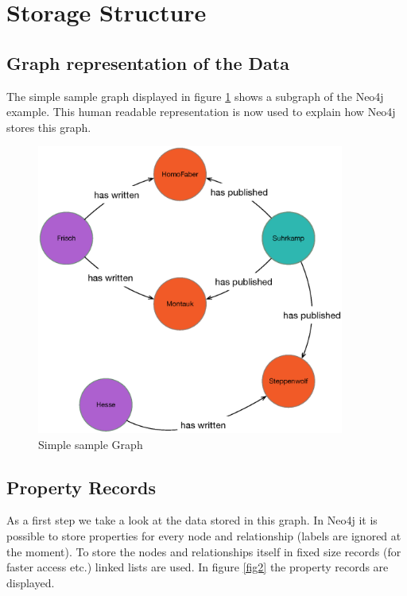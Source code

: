 
\section{Storage Structure}

\subsection{Graph representation of the Data}
The simple sample graph displayed in figure \ref{fig1} shows a subgraph of the Neo4j example.
This human readable representation is now used to explain how Neo4j stores this graph. \nocite{storage1} \nocite{storage2}

\begin{figure}
	\centering
 	 	\includegraphics[width=0.9\textwidth]{images/theGraph.eps}
	\caption{Simple sample Graph}
	\label{fig1}
\end{figure}

\subsection{Property Records}
As a first step we take a look at the data stored in this graph. In Neo4j it is possible to store properties for every node and relationship (labels are ignored at the moment). To store the nodes and relationships itself in fixed size records (for faster access etc.) linked lists are used.
In figure \ref{fig2} the property records are displayed.

